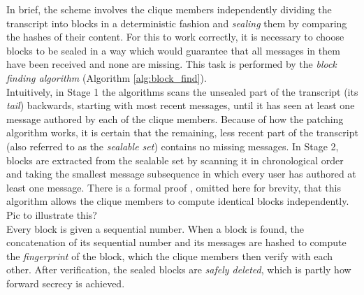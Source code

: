 \documentclass[a4paper, 12pt]{report}
\begin{document}
In brief, the scheme involves the clique members independently dividing the transcript into blocks in a deterministic fashion and \emph{sealing} them by comparing the hashes of their content. For this to work correctly, it is necessary to choose blocks to be sealed in a way which would guarantee that all messages in them have been received and none are missing. This task is performed by the \emph{block finding algorithm} (Algorithm \ref{alg:block_find}). \\

Intuitively, in Stage 1 the algorithms scans the unsealed part of the transcript (its \emph{tail}) backwards, starting with most recent messages, until it has seen at least one message authored by each of the clique members. Because of how the patching algorithm works, it is certain that the remaining, less recent part of the transcript (also referred to as the \emph{sealable set}) contains no missing messages. In Stage 2, blocks are extracted from the sealable set by scanning it in chronological order and taking the smallest message subsequence in which every user has authored at least one message. There is a formal proof \cite{reardon2007kleeq}, omitted here for brevity, that this algorithm allows the clique members to compute identical blocks independently. {\color{red} Pic to illustrate this?}\\

Every block is given a sequential number. When a block is found, the concatenation of its sequential number and its messages are hashed to compute the \emph{fingerprint} of the block, which the clique members then verify with each other. After verification, the sealed blocks are \emph{safely deleted}, which is partly how forward secrecy is achieved.
\end{document}

